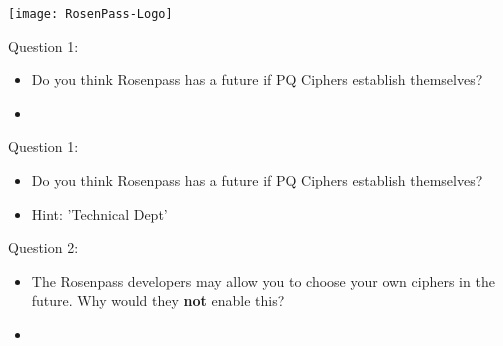 \documentclass{rosenpass-beamer}
\begin{document}

\begin{frame}
\centering
\texttt{[image: RosenPass-Logo]}
\end{frame}

\printbibliography

\edef\totalcontentframes{\theframenumber}


\begin{frame}{Question 1:}
\begin{itemize}
  \item Do you think Rosenpass has a future if PQ Ciphers establish themselves?
  \item 
\end{itemize}
\end{frame}


\begin{frame}{Question 1:}
\begin{itemize}
  \item Do you think Rosenpass has a future if PQ Ciphers establish themselves?
  \item Hint: 'Technical Dept'
\end{itemize}
\end{frame}


\begin{frame}{Question 2:}
\begin{itemize}
  \item The Rosenpass developers may allow you to choose your own ciphers in the future.
    Why would they \textbf{not} enable this?
  \item 
\end{itemize}
\end{frame}

\end{document}
